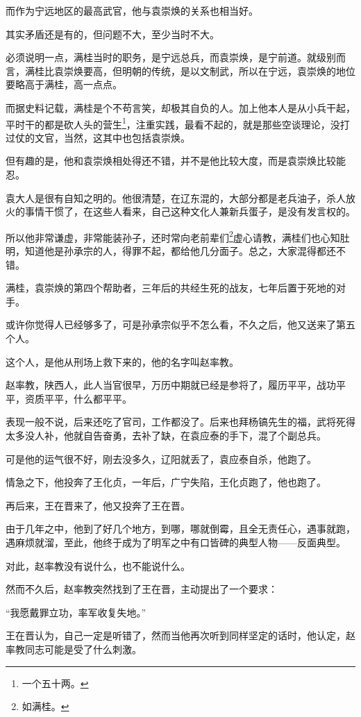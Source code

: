 \begin{multicols}{\theparacolNo}
而作为宁远地区的最高武官，他与袁崇焕的关系也相当好。

其实矛盾还是有的，但问题不大，至少当时不大。

必须说明一点，满桂当时的职务，是宁远总兵，而袁崇焕，是宁前道。就级别而言，满桂比袁崇焕要高，但明朝的传统，是以文制武，所以在宁远，袁崇焕的地位要略高于满桂，高一点点。

而据史料记载，满桂是个不苟言笑，却极其自负的人。加上他本人是从小兵干起，平时干的都是砍人头的营生\footnote{一个五十两。}，注重实践，最看不起的，就是那些空谈理论，没打过仗的文官，当然，这其中也包括袁崇焕。

但有趣的是，他和袁崇焕相处得还不错，并不是他比较大度，而是袁崇焕比较能忍。

袁大人是很有自知之明的。他很清楚，在辽东混的，大部分都是老兵油子，杀人放火的事情干惯了，在这些人看来，自己这种文化人兼新兵蛋子，是没有发言权的。

所以他非常谦虚，非常能装孙子，还时常向老前辈们\footnote{如满桂。}虚心请教，满桂们也心知肚明，知道他是孙承宗的人，得罪不起，都给他几分面子。总之，大家混得都还不错。

满桂，袁崇焕的第四个帮助者，三年后的共经生死的战友，七年后置于死地的对手。

或许你觉得人已经够多了，可是孙承宗似乎不怎么看，不久之后，他又送来了第五个人。

这个人，是他从刑场上救下来的，他的名字叫赵率教。

赵率教，陕西人，此人当官很早，万历中期就已经是参将了，履历平平，战功平平，资质平平，什么都平平。

表现一般不说，后来还吃了官司，工作都没了。后来也拜杨镐先生的福，武将死得太多没人补，他就自告奋勇，去补了缺，在袁应泰的手下，混了个副总兵。

可是他的运气很不好，刚去没多久，辽阳就丢了，袁应泰自杀，他跑了。

情急之下，他投奔了王化贞，一年后，广宁失陷，王化贞跑了，他也跑了。

再后来，王在晋来了，他又投奔了王在晋。

由于几年之中，他到了好几个地方，到哪，哪就倒霉，且全无责任心，遇事就跑，遇麻烦就溜，至此，他终于成为了明军之中有口皆碑的典型人物——反面典型。

对此，赵率教没有说什么，也不能说什么。

然而不久后，赵率教突然找到了王在晋，主动提出了一个要求：

“我愿戴罪立功，率军收复失地。”

王在晋认为，自己一定是听错了，然而当他再次听到同样坚定的话时，他认定，赵率教同志可能是受了什么刺激。


\end{multicols}
